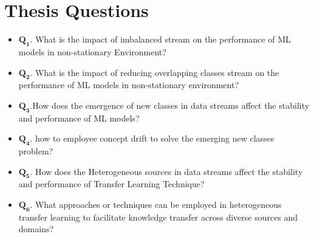 \section{Thesis Questions}
\label{sec:1_introduction_questions}

\begin{itemize}
       \item $\pmb{Q_1}$. What is the impact of imbalanced stream on the performance of ML models in non-stationary Environment?
        \item $\pmb{Q_2}$. What is the impact of reducing overlapping classes stream on the performance of ML models in non-stationary environment?
        \item $\pmb{Q_3}$.How does the emergence of new classes in data streams affect the stability and performance of ML models?
        \item $\pmb{Q_4}$. how to employee concept drift to solve the emerging new classes problem?
        \item $\pmb{Q_5}$. How does the Heterogeneous sources in data streams affect the stability and performance of Transfer Learning Technique?
        \item $\pmb{Q_6}$. What approaches or techniques can be employed in heterogeneous transfer learning to facilitate knowledge transfer across diverse sources and domains?
    \end{itemize}
    